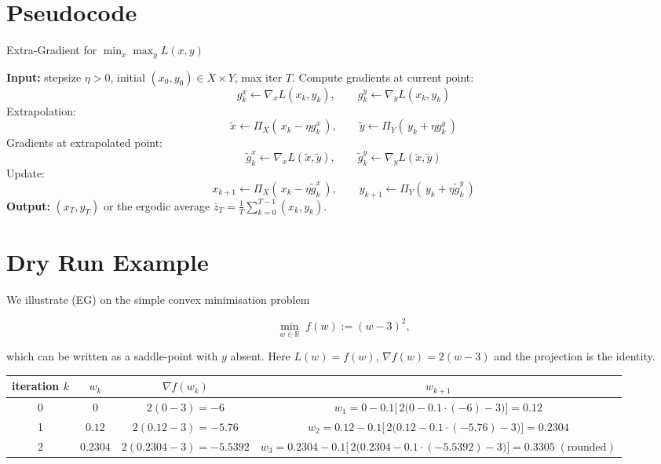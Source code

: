 \documentclass{article}
\newcommand{\proj}[2]{\Pi_{#1}\!\left(#2\right)}
\newcommand{\R}{\mathbb{R}}
\begin{document}
\section*{Pseudocode}
\begin{algorithm}[H]
\caption{Extra‑Gradient for $\min_{x}\max_{y}L(x,y)$}
\begin{algorithmic}[1]
\State \textbf{Input:} stepsize $\eta>0$, initial $(x_{0},y_{0})\in X\times Y$, max iter $T$.
    \State Compute gradients at current point:
    \[
    g^{x}_{k}\gets \nabla_{x}L(x_{k},y_{k}),\qquad 
    g^{y}_{k}\gets \nabla_{y}L(x_{k},y_{k})
    \]
    \State Extrapolation:
    \[
    \tilde{x}\gets \proj{X}{\,x_{k}-\eta g^{x}_{k}\,},\qquad
    \tilde{y}\gets \proj{Y}{\,y_{k}+\eta g^{y}_{k}\,}
    \]
    \State Gradients at extrapolated point:
    \[
    \tilde{g}^{x}_{k}\gets \nabla_{x}L(\tilde{x},\tilde{y}),\qquad
    \tilde{g}^{y}_{k}\gets \nabla_{y}L(\tilde{x},\tilde{y})
    \]
    \State Update:
    \[
    x_{k+1}\gets \proj{X}{\,x_{k}-\eta \tilde{g}^{x}_{k}\,},\qquad
    y_{k+1}\gets \proj{Y}{\,y_{k}+\eta \tilde{g}^{y}_{k}\,}
    \]
\EndFor
\State \textbf{Output:} $(x_{T},y_{T})$ or the ergodic average
$\displaystyle \bar z_{T}=\frac1T\sum_{k=0}^{T-1}(x_{k},y_{k})$.
\end{algorithmic}
\end{algorithm}

\section*{Dry Run Example}
We illustrate (EG) on the simple convex minimisation problem  

\[
\min_{w\in\R} \; f(w):=(w-3)^{2},
\]

which can be written as a saddle‑point with $y$ absent.  
Here $L(w)=f(w)$, $\nabla f(w)=2(w-3)$ and the projection is the identity.

\begin{center}
\begin{tabular}{c|c|c|c}
iteration $k$ & $w_{k}$ & $\nabla f(w_{k})$ & $w_{k+1}$ \\\hline
0 & $0$ & $2(0-3)=-6$ & $w_{1}=0-0.1\bigl[\,2\bigl(0-0.1\cdot(-6)-3\bigr)\bigr]=0.12$\\[2mm]
1 & $0.12$ & $2(0.12-3)=-5.76$ &
$w_{2}=0.12-0.1\bigl[\,2\bigl(0.12-0.1\cdot(-5.76)-3\bigr)\bigr]=0.2304$\\[2mm]
2 & $0.2304$ & $2(0.2304-3)=-5.5392$ &
$w_{3}=0.2304-0.1\bigl[\,2\bigl(0.2304-0.1\cdot(-5.5392)-3\bigr)\bigr]=0.3305\;(\text{rounded})$
\end{tabular}
\end{center}
\end{document}
